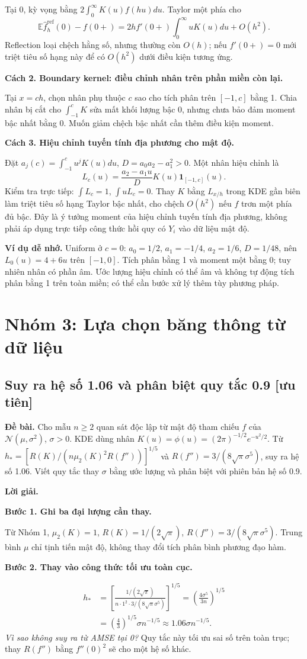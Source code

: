 \documentclass[11pt,a4paper]{article}
\newcommand{\E}{\mathbb E}
\newcommand{\buoc}[1]{\par\medskip\textbf{#1}\par}
\begin{document}
Tại 0, kỳ vọng bằng $2\int_0^\infty K(u)f(hu)du$. Taylor một phía cho
\[
\E\widehat f_h^{\mathrm{ref}}(0)-f(0+)
=2h f'(0+)\int_0^\infty uK(u)du+O(h^2).
\]
Reflection loại chệch hằng số, nhưng thường còn $O(h)$; nếu $f'(0+)=0$ mới triệt tiêu số hạng này để có $O(h^2)$ dưới điều kiện tương ứng.

\buoc{Cách 2. Boundary kernel: điều chỉnh nhân trên phần miền còn lại.}
Tại $x=ch$, chọn nhân phụ thuộc $c$ sao cho tích phân trên $[-1,c]$ bằng 1. Chia nhân bị cắt cho $\int_{-1}^cK$ sửa mất khối lượng bậc 0, nhưng chưa bảo đảm moment bậc nhất bằng 0. Muốn giảm chệch bậc nhất cần thêm điều kiện moment.

\buoc{Cách 3. Hiệu chỉnh tuyến tính địa phương cho mật độ.}
Đặt $a_j(c)=\int_{-1}^{c}u^jK(u)du$, $D=a_0a_2-a_1^2>0$. Một nhân hiệu chỉnh là
\[
L_c(u)=\frac{a_2-a_1u}{D}K(u)\mathbf1_{[-1,c]}(u).
\]
Kiểm tra trực tiếp: $\int L_c=1$, $\int uL_c=0$. Thay $K$ bằng $L_{x/h}$ trong KDE gần biên làm triệt tiêu số hạng Taylor bậc nhất, cho chệch $O(h^2)$ nếu $f$ trơn một phía đủ bậc. Đây là ý tưởng moment của hiệu chỉnh tuyến tính địa phương, không phải áp dụng trực tiếp công thức hồi quy có $Y_i$ vào dữ liệu mật độ.

\textbf{Ví dụ dễ nhớ.} Uniform ở $c=0$: $a_0=1/2$, $a_1=-1/4$, $a_2=1/6$, $D=1/48$, nên $L_0(u)=4+6u$ trên $[-1,0]$. Tích phân bằng 1 và moment một bằng 0; tuy nhiên nhân có phần âm. Ước lượng hiệu chỉnh có thể âm và không tự động tích phân bằng 1 trên toàn miền; có thể cần bước xử lý thêm tùy phương pháp.

\section{Nhóm 3: Lựa chọn băng thông từ dữ liệu}
\subsection{Suy ra hệ số 1.06 và phân biệt quy tắc 0.9 [ưu tiên]}\label{sec:silverman}
\textbf{Đề bài.} Cho mẫu $n\geq2$ quan sát độc lập từ mật độ tham chiếu
$f$ của $\mathcal N(\mu,\sigma^2)$, $\sigma>0$.
KDE dùng nhân $K(u)=\phi(u)=(2\pi)^{-1/2}e^{-u^2/2}$.
Từ $h_*=[R(K)/(n\mu_2(K)^2R(f''))]^{1/5}$ và
$R(f'')=3/(8\sqrt\pi\sigma^5)$, suy ra hệ số 1.06.
Viết quy tắc thay $\sigma$ bằng ước lượng và phân biệt với phiên bản hệ số 0.9.

\textbf{Lời giải.}

\buoc{Bước 1. Ghi ba đại lượng cần thay.}
Từ Nhóm 1, $\mu_2(K)=1$, $R(K)=1/(2\sqrt\pi)$, $R(f'')=3/(8\sqrt\pi\sigma^5)$. Trung bình $\mu$ chỉ tịnh tiến mật độ, không thay đổi tích phân bình phương đạo hàm.
\buoc{Bước 2. Thay vào công thức tối ưu toàn cục.}
\begin{align*}
h_*&=\left[\frac{1/(2\sqrt\pi)}{n\cdot1^2\cdot3/(8\sqrt\pi\sigma^5)}\right]^{1/5}
=\left(\frac{4\sigma^5}{3n}\right)^{1/5}\\
&=\left(\frac43\right)^{1/5}\sigma n^{-1/5}
\approx\boxed{1.06\sigma n^{-1/5}}.
\end{align*}
\textit{Vì sao không suy ra từ AMSE tại 0?} Quy tắc này tối ưu sai số trên toàn trục; thay $R(f'')$ bằng $f''(0)^2$ sẽ cho một hệ số khác.
\end{document}
